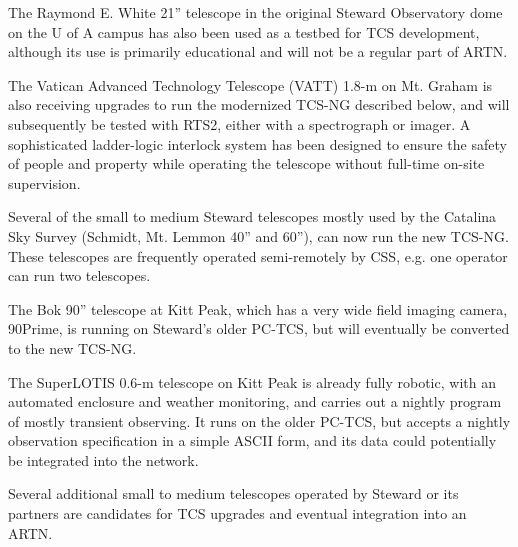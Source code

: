 \documentclass[]{spie}  %
\begin{document}
The Raymond E. White 21'' telescope in the original Steward Observatory dome on the U of A campus has also been used as a testbed for TCS development, although its use is primarily educational and will not be a regular part of ARTN.

The Vatican Advanced Technology Telescope (VATT) 1.8-m on Mt. Graham is also receiving upgrades to run the modernized TCS-NG described below, and will subsequently be tested with RTS2, either with a spectrograph or imager. A sophisticated ladder-logic interlock system has been designed to ensure the safety of people and property while operating the telescope without full-time on-site supervision.

Several of the small to medium Steward telescopes mostly used by the Catalina Sky Survey (Schmidt, Mt. Lemmon 40'' and 60''), can now run the new TCS-NG. These telescopes are frequently operated semi-remotely by CSS, e.g. one operator can run two telescopes.

The Bok 90'' telescope at Kitt Peak, which has a very wide field imaging camera, 90Prime, is running on Steward's older PC-TCS, but will eventually be converted to the new TCS-NG.

The SuperLOTIS 0.6-m telescope on Kitt Peak is already fully robotic, with an automated enclosure and weather monitoring, and carries out a nightly program of mostly transient observing. It runs on the older PC-TCS, but accepts a nightly observation specification in a simple ASCII form, and its data could potentially be integrated into the network.

Several additional small to medium telescopes operated by Steward or its partners are candidates for TCS upgrades and eventual integration into an ARTN.
\end{document}
